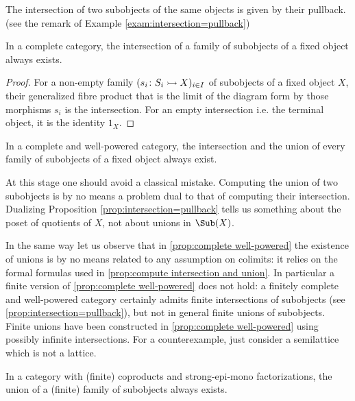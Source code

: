 \begin{prop}\label{prop:intersection=pullback}
  The intersection of two subobjects of the same objects is given by their pullback. (see the remark of Example \ref{exam:intersection=pullback})
\end{prop}
\begin{prop}
  In a complete category, the intersection of a family of subobjects of a fixed object always exists.
\end{prop}
\begin{proof}
  For a non-empty family $(s_i\colon S_i\rightarrowtail X)_{i\in I}$ of subobjects of a fixed object $X$, their generalized fibre product that is the limit of the diagram form by those morphisms $s_i$ is the intersection. For an empty intersection i.e. the terminal object, it is the identity $1_X$.
\end{proof}
\begin{cor}\label{prop:complete well-powered}
  In a complete and well-powered category, the intersection and the union of every family of subobjects of a fixed object always exist.
\end{cor}
\begin{rem}
  At this stage one should avoid a classical mistake. Computing the union of two subobjects is by no means a problem dual to that of computing their intersection. Dualizing Proposition \ref{prop:intersection=pullback} tells us something about the poset of quotients of $X$, not about unions in $\Sub(X)$. 
  
  In the same way let us observe that in \ref{prop:complete well-powered} the existence of unions is by no means related to any assumption on colimits: it relies on the formal formulas used in \ref{prop:compute intersection and union}. In particular a finite version of \ref{prop:complete well-powered} does not hold: a finitely complete and well-powered category certainly admits finite intersections of subobjects (see \ref{prop:intersection=pullback}), but not in general finite unions of subobjects. Finite unions have been constructed in \ref{prop:complete well-powered} using possibly infinite intersections. For a counterexample, just consider a semilattice which is not a lattice.
\end{rem}

\begin{prop}
  In a category with (finite) coproducts and strong-epi-mono factorizations, the union of a (finite) family of subobjects always exists.
\end{prop}

